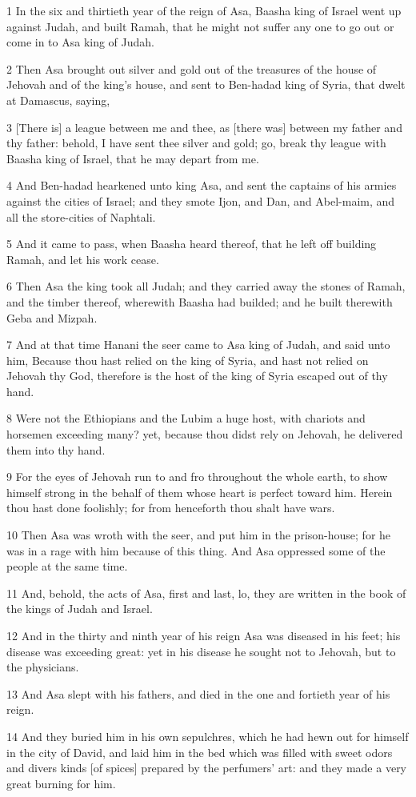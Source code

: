 \par 1 In the six and thirtieth year of the reign of Asa, Baasha king of Israel went up against Judah, and built Ramah, that he might not suffer any one to go out or come in to Asa king of Judah.
\par 2 Then Asa brought out silver and gold out of the treasures of the house of Jehovah and of the king's house, and sent to Ben-hadad king of Syria, that dwelt at Damascus, saying,
\par 3 [There is] a league between me and thee, as [there was] between my father and thy father: behold, I have sent thee silver and gold; go, break thy league with Baasha king of Israel, that he may depart from me.
\par 4 And Ben-hadad hearkened unto king Asa, and sent the captains of his armies against the cities of Israel; and they smote Ijon, and Dan, and Abel-maim, and all the store-cities of Naphtali.
\par 5 And it came to pass, when Baasha heard thereof, that he left off building Ramah, and let his work cease.
\par 6 Then Asa the king took all Judah; and they carried away the stones of Ramah, and the timber thereof, wherewith Baasha had builded; and he built therewith Geba and Mizpah.
\par 7 And at that time Hanani the seer came to Asa king of Judah, and said unto him, Because thou hast relied on the king of Syria, and hast not relied on Jehovah thy God, therefore is the host of the king of Syria escaped out of thy hand.
\par 8 Were not the Ethiopians and the Lubim a huge host, with chariots and horsemen exceeding many? yet, because thou didst rely on Jehovah, he delivered them into thy hand.
\par 9 For the eyes of Jehovah run to and fro throughout the whole earth, to show himself strong in the behalf of them whose heart is perfect toward him. Herein thou hast done foolishly; for from henceforth thou shalt have wars.
\par 10 Then Asa was wroth with the seer, and put him in the prison-house; for he was in a rage with him because of this thing. And Asa oppressed some of the people at the same time.
\par 11 And, behold, the acts of Asa, first and last, lo, they are written in the book of the kings of Judah and Israel.
\par 12 And in the thirty and ninth year of his reign Asa was diseased in his feet; his disease was exceeding great: yet in his disease he sought not to Jehovah, but to the physicians.
\par 13 And Asa slept with his fathers, and died in the one and fortieth year of his reign.
\par 14 And they buried him in his own sepulchres, which he had hewn out for himself in the city of David, and laid him in the bed which was filled with sweet odors and divers kinds [of spices] prepared by the perfumers' art: and they made a very great burning for him.

